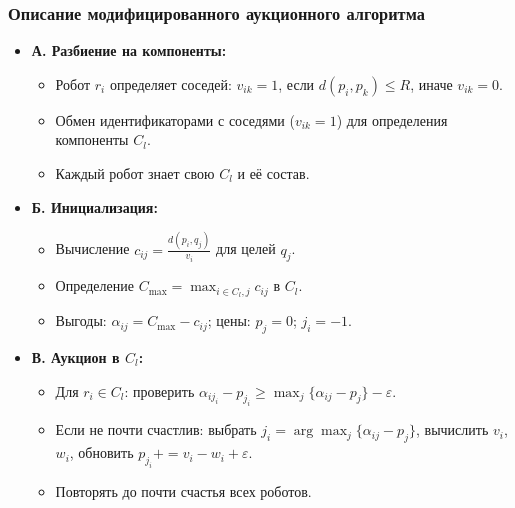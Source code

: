 \documentclass{beamer}
\begin{document}
	\begin{frame}
	    \frametitle{Описание модифицированного аукционного алгоритма}
	            \begin{itemize}
	                \item \textbf{А. Разбиение на компоненты:}
	                \begin{itemize}
	                    \item Робот $r_i$ определяет соседей: $v_{ik} = 1$, если $d(p_i, p_k) \leq R$, иначе $v_{ik} = 0$.
	                    \item Обмен идентификаторами с соседями ($v_{ik} = 1$) для определения компоненты $C_l$.
	                    \item Каждый робот знает свою $C_l$ и её состав.
	                \end{itemize}
	                \item \textbf{Б. Инициализация:}
	                \begin{itemize}
	                    \item Вычисление $c_{ij} = \frac{d(p_i, q_j)}{v_i}$ для целей $q_j$.
	                    \item Определение $C_{\max} = \max_{i \in C_l, j} c_{ij}$ в $C_l$.
	                    \item Выгоды: $\alpha_{ij} = C_{\max} - c_{ij}$; цены: $p_j = 0$; $j_i = -1$.
	                \end{itemize}
	                \item \textbf{В. Аукцион в $C_l$:}
	                \begin{itemize}
	                    \item Для $r_i \in C_l$: проверить $\alpha_{i j_i} - p_{j_i} \geq \max_j \{\alpha_{ij} - p_j\} - \varepsilon$.
	                    \item Если не почти счастлив: выбрать $j_i = \arg\max_j \{\alpha_{ij} - p_j\}$, вычислить $v_i$, $w_i$, обновить $p_{j_i} += v_i - w_i + \varepsilon$.
	                    \item Повторять до почти счастья всех роботов.
	                \end{itemize}
	            \end{itemize}
	\end{frame}
	
\end{document}
